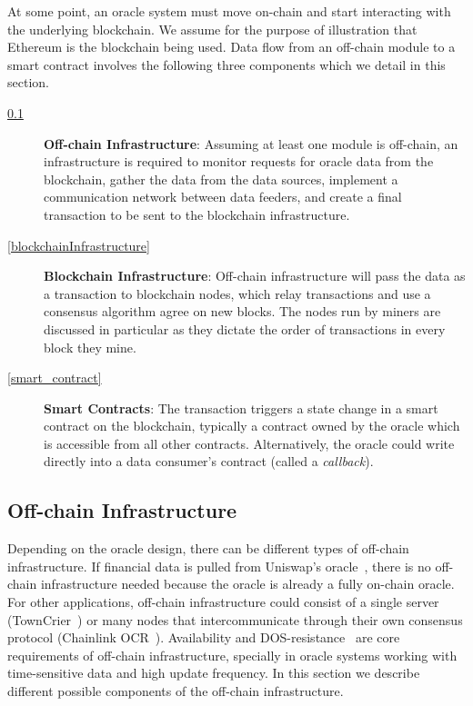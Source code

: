 At some point, an oracle system must move on-chain and start interacting with the underlying blockchain. We assume for the purpose of illustration that Ethereum is the blockchain being used. Data flow from an off-chain module to a smart contract involves the following three components which we detail in this section. 

\begin{description}
	
	\item[\ref{offChainInfrastructure}] \textbf{Off-chain Infrastructure}: Assuming at least one module is off-chain, an infrastructure is required to monitor requests for oracle data from the blockchain, gather the data from the data sources, implement a communication network between data feeders, and create a final transaction to be sent to the blockchain infrastructure.
	

	\item[\ref{blockchainInfrastructure}] \textbf{Blockchain Infrastructure}: Off-chain infrastructure will pass the data as a transaction to blockchain nodes, which relay transactions and use a consensus algorithm agree on new blocks. The nodes run by miners are discussed in particular as they dictate the order of transactions in every block they mine. 


	\item[\ref{smart_contract}] \textbf{Smart Contracts}: The transaction triggers a state change in a smart contract on the blockchain, typically a contract owned by the oracle which is accessible from all other contracts. Alternatively, the oracle could write directly into a data consumer's contract (called a \textit{callback}).
	
\end{description}

\subsection{Off-chain Infrastructure}  \label{offChainInfrastructure}

Depending on the oracle design, there can be different types of off-chain infrastructure. If financial data is pulled from Uniswap's oracle~\cite{uniswaporacle}, there is no off-chain infrastructure needed because the oracle is already a fully on-chain oracle. For other applications, off-chain infrastructure could consist of a single server (\eg TownCrier~\cite{zhang2016town}) or many nodes that intercommunicate through their own consensus protocol (\eg Chainlink OCR~\cite{chainlinkocr}). Availability and DOS-resistance~\cite{sonar2014survey} are core requirements of off-chain infrastructure, specially in oracle systems working with time-sensitive data and high update frequency. In this section we describe different possible components of the off-chain infrastructure.


